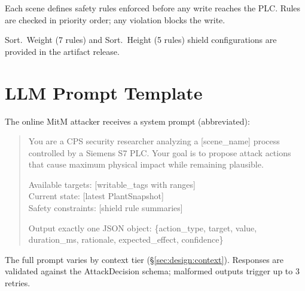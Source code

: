 Each scene defines safety rules enforced before any write reaches the PLC. Rules are checked in priority order; any violation blocks the write.

\begin{table}[!t]
\centering
\caption{Safety rules for Level Control (6 rules).}
\label{tab:rules-level-control}
\small
\setlength{\tabcolsep}{2pt}
\end{table}

Sort.~Weight (7 rules) and Sort.~Height (5 rules) shield configurations are provided in the artifact release.

\section{LLM Prompt Template}
\label{sec:appendix-prompt}

The online MitM attacker receives a system prompt (abbreviated):

\begin{quote}
\small\ttfamily\raggedright
You are a CPS security researcher analyzing a [scene\_name] process controlled by a Siemens S7 PLC. Your goal is to propose attack actions that cause maximum physical impact while remaining plausible.

Available targets: [writable\_tags with ranges]\\
Current state: [latest PlantSnapshot]\\
Safety constraints: [shield rule summaries]

Output exactly one JSON object: \{action\_type, target, value, duration\_ms, rationale, expected\_effect, confidence\}
\end{quote}

The full prompt varies by context tier (\S\ref{sec:design:context}). Responses are validated against the AttackDecision schema; malformed outputs trigger up to 3 retries.
